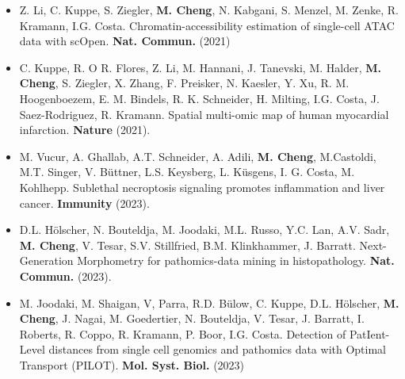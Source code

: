 \begin{addmargin}{0.02\textwidth}
	\begin{itemize}
	\item Z. Li, C. Kuppe, S. Ziegler, \textbf{M. Cheng}, N. Kabgani, S. Menzel, M. Zenke, R. Kramann, I.G. Costa. Chromatin-accessibility estimation of single-cell ATAC data with scOpen. \textbf{Nat. Commun.} (2021)
	\end{itemize}
\end{addmargin}

\begin{addmargin}{0.02\textwidth}
	\begin{itemize}
	\item C. Kuppe, R. O R. Flores, Z. Li, M. Hannani, J. Tanevski, M. Halder, \textbf{M. Cheng}, S. Ziegler, X. Zhang, F. Preisker, N. Kaesler, Y. Xu, R. M. Hoogenboezem, E. M. Bindels, R. K. Schneider, H. Milting, I.G. Costa, J. Saez-Rodriguez, R. Kramann. Spatial multi-omic map of human myocardial infarction. \textbf{Nature} (2021).
    \end{itemize}
\end{addmargin}

\begin{addmargin}{0.02\textwidth}
	\begin{itemize}
	\item M. Vucur,  A. Ghallab, A.T. Schneider, A. Adili,  \textbf{M. Cheng},  M.Castoldi, M.T. Singer,  V. Büttner, L.S. Keysberg, L. Küsgens, I. G. Costa, M. Kohlhepp.  Sublethal necroptosis signaling promotes inflammation and liver cancer. \textbf{Immunity} (2023).
	\end{itemize}
\end{addmargin}

\begin{addmargin}{0.02\textwidth}
	\begin{itemize}
	\item  D.L. Hölscher, N. Bouteldja, M. Joodaki, M.L. Russo, Y.C. Lan, A.V. Sadr, \textbf{M. Cheng}, V. Tesar, S.V. Stillfried, B.M. Klinkhammer, J. Barratt. Next-Generation Morphometry for pathomics-data mining in histopathology. \textbf{Nat. Commun.} (2023).
	\end{itemize}
\end{addmargin}

\begin{addmargin}{0.02\textwidth}
	\begin{itemize}
	\item M. Joodaki, M. Shaigan, V, Parra, R.D. Bülow, C. Kuppe, D.L. Hölscher, \textbf{M. Cheng}, J. Nagai, M. Goedertier, N. Bouteldja, V. Tesar, J. Barratt, I. Roberts, R. Coppo, R. Kramann, P. Boor, I.G. Costa. Detection of PatIent-Level distances from single cell genomics and pathomics data with Optimal Transport (PILOT). \textbf{Mol. Syst. Biol.} (2023)
	\end{itemize}
\end{addmargin}


